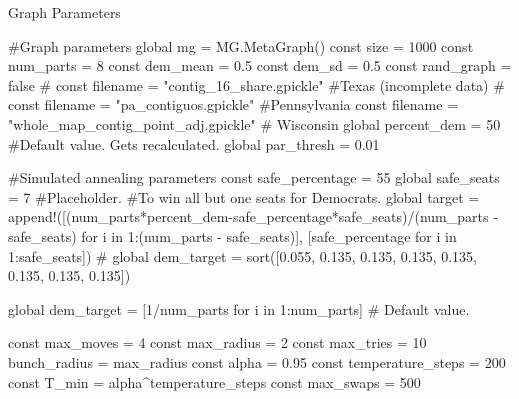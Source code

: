 Graph Parameters

#Graph parameters
global mg = MG.MetaGraph()
const size = 1000
const num_parts = 8
const dem_mean = 0.5
const dem_sd = 0.5
const rand_graph = false
# const filename = "contig_16_share.gpickle" #Texas (incomplete data)
# const filename = "pa_contiguos.gpickle" #Pennsylvania
const filename = "whole_map_contig_point_adj.gpickle" # Wisconsin
global percent_dem = 50 #Default value.  Gets recalculated.
global par_thresh = 0.01

#Simulated annealing parameters
const safe_percentage = 55
global safe_seats = 7 #Placeholder.
#To win all but one seats for Democrats.
global target = append!([(num_parts*percent_dem-safe_percentage*safe_seats)/(num_parts - safe_seats) for i in 1:(num_parts - safe_seats)],
                 [safe_percentage for i in 1:safe_seats])
# global dem_target = sort([0.055, 0.135, 0.135, 0.135, 0.135, 0.135, 0.135, 0.135])

global dem_target = [1/num_parts for i in 1:num_parts] # Default value.

const max_moves = 4
const max_radius = 2
const max_tries = 10
bunch_radius = max_radius
const alpha = 0.95
const temperature_steps = 200
const T_min = alpha^temperature_steps
const max_swaps = 500